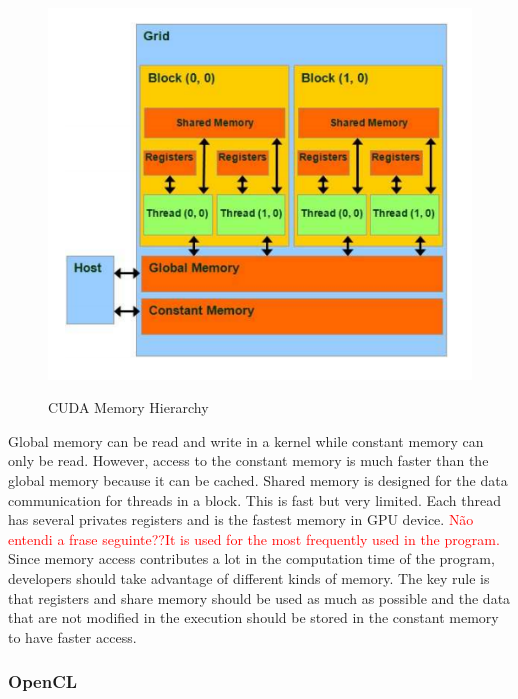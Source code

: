 \documentclass[Ingles]{ic-tese-v1}
\newcommand{\marcio}[1]{\textcolor{red}{ {#1}}}
\newcommand{\ed}[1]{\noindent\textcolor{red}{ {#1}}}
\newcommand{\marcio}[1]{}
\newcommand{\ed}[1]{}
\begin{document}
\begin{figure}[t]
	\caption{CUDA Memory Hierarchy}
	\centering
	\includegraphics[scale=0.70]{images/cuda_memory.png}
	\label{fig:cudamemory}
\end{figure}

Global memory can be read and write in a kernel while constant memory can only be
read. However, access to the constant memory is much faster than the global memory because it can be cached. Shared memory is designed for the data communication for
threads in a block. This is fast but very limited. Each thread has several privates registers and is the fastest memory in GPU device. \marcio{Não entendi a frase seguinte??}\ed{It is used for the most frequently used in the program.} Since memory access contributes a lot in the computation time of the program, developers should take advantage of different kinds of memory. The key rule is that registers and share memory should be used as much as possible and the data that are not modified in the execution should be stored in the constant memory to have faster access.

\subsubsection{OpenCL}
\end{document}
